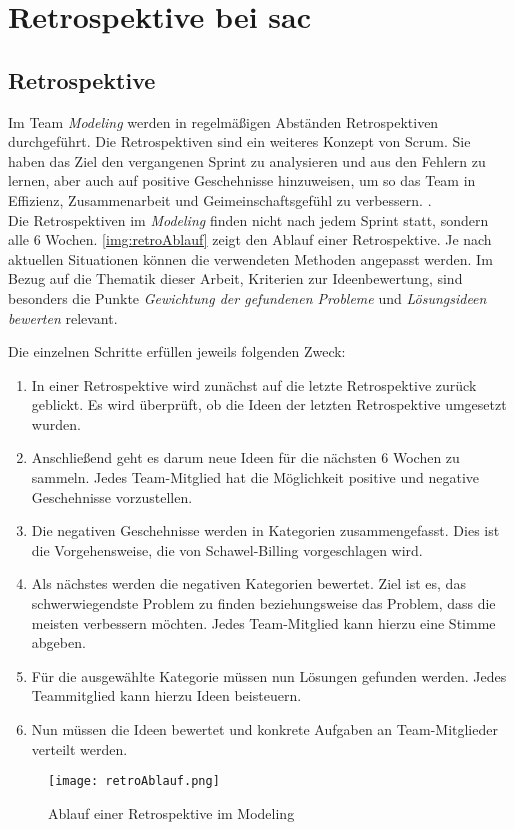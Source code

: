 \section{Retrospektive bei \ac{sac}}\label{sec:retro}
\subsection{Retrospektive}
Im Team \textit{Modeling} werden in regelmäßigen Abständen Retrospektiven durchgeführt. 
Die Retrospektiven sind ein weiteres Konzept von Scrum. Sie haben das Ziel den vergangenen Sprint zu analysieren und aus den Fehlern zu lernen, aber auch  auf positive 
Geschehnisse hinzuweisen, um so das Team in Effizienz, Zusammenarbeit und Geimeinschaftsgefühl zu verbessern. \cite{retro:2018}. \\
Die Retrospektiven im \textit{Modeling} finden nicht nach jedem Sprint statt, sondern alle 6 Wochen.
\autoref{img:retroAblauf} zeigt den Ablauf einer Retrospektive. Je nach aktuellen Situationen können die 
verwendeten Methoden angepasst werden. Im Bezug auf die Thematik dieser Arbeit, Kriterien zur Ideenbewertung,  
sind besonders die Punkte \textit{Gewichtung der gefundenen Probleme} und \textit{Lösungsideen bewerten} relevant.

Die einzelnen Schritte erfüllen jeweils folgenden Zweck:
\begin{enumerate}
    \item In einer Retrospektive wird zunächst auf die letzte Retrospektive zurück geblickt. Es wird überprüft, ob die Ideen der letzten 
        Retrospektive umgesetzt wurden.
    \item Anschließend geht es darum neue Ideen für die nächsten 6 Wochen zu sammeln. Jedes Team-Mitglied
        hat die Möglichkeit positive und negative Geschehnisse vorzustellen.
    \item Die negativen Geschehnisse werden in Kategorien zusammengefasst. Dies ist die Vorgehensweise, die von Schawel-Billing vorgeschlagen wird.
    \item Als nächstes werden die negativen Kategorien bewertet. Ziel ist es, das schwerwiegendste Problem zu finden beziehungsweise 
    das Problem, dass die meisten verbessern möchten. Jedes Team-Mitglied kann hierzu eine Stimme abgeben. 
    \item Für die ausgewählte Kategorie müssen nun Lösungen gefunden werden. Jedes Teammitglied kann hierzu Ideen beisteuern. 
    \item Nun müssen die Ideen bewertet und konkrete Aufgaben an Team-Mitglieder verteilt werden.
\end{enumerate}
\begin{figure}[ht]
	\centering
	\texttt{[image: retroAblauf.png]}
    \caption{Ablauf einer Retrospektive im Modeling}
	\label{img:retroAblauf}
\end{figure}

